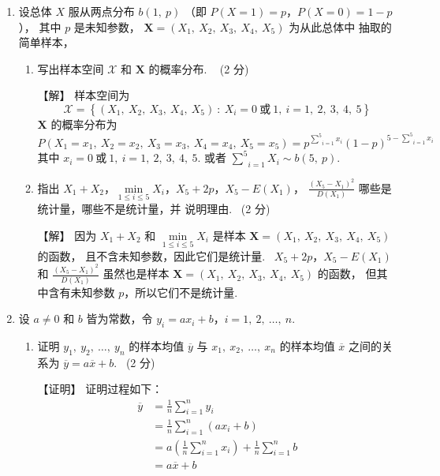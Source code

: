 \documentclass[openany]{book}
\begin{document}
\begin{enumerate}
  \item 设总体 $X$ 服从两点分布 $b(1,~p)$ （即 $P(X=1)=p$，$P(X=0)=1-p$），
  其中 $p$ 是未知参数，
  $\boldsymbol{X} = \left( X_1,~X_2,~X_3,~X_4,~X_5 \right)$ 为从此总体中
  抽取的简单样本，
  \begin{enumerate}
    \item 写出样本空间 $\mathscr{X}$ 和 $\boldsymbol{X}$ 的概率分布.
    ~{\color{cyan} (2 分)}

    {\color{red} \heiti 【解】} {\color{teal} \kaishu
      样本空间为
      $$ \mathscr{X} = \left\{ \left( X_1,~ X_2,~ X_3,~ X_4,~
      X_5\right) ~:~X_i = 0 ~ \text{或} ~1,~ i=1,~2,~3,~4,~5 \right\}
      $$
      $\boldsymbol{X}$ 的概率分布为
      $$ P \left( X_1=x_1,~X_2=x_2,~X_3=x_3,~X_4=x_4,~X_5=x_5 \right)
      = p^{\underset{i=1}{\overset{5}{\sum}} x_i}
      \left( 1 - p \right)^{5 - \underset{i=1}{\overset{5}{\sum}}
        x_i} $$
      其中 $x_i = 0 ~ \text{或} ~1,~ i=1,~2,~3,~4,~5 $. 或者
      $\underset{i=1}{\overset{5}{\sum}} X_i \sim b \left( 5,~ p
      \right)$.
    }

    \item 指出 $X_1+X_2$，$\underset{1\leq i \leq 5}{\min}
    X_i$，$X_5+2p$，$X_5-E\left(X_1\right)$，
    $\displaystyle{\frac{\left(
        X_5-X_1\right)^2}{D\left(X_1\right)}}$ 哪些是统计量，哪些不是统计量，并
    说明理由.~{\color{cyan} (2 分)}

    {\color{red} \heiti 【解】} {\color{teal} \kaishu
      因为 $X_1+X_2$ 和 $\underset{1\leq i \leq 5}{\min} X_i$ 是样本
      $\boldsymbol{X} = \left( X_1,~X_2,~X_3,~X_4,~X_5 \right)$
      的函数，
      且不含未知参数，因此它们是统计量.~
      $X_5+2p$，$X_5-E\left(X_1\right)$ 和 $\displaystyle{\frac{\left(
          X_5-X_1\right)^2}{D\left(X_1\right)}}$  虽然也是样本
      $\boldsymbol{X} = \left( X_1,~X_2,~X_3,~X_4,~X_5 \right)$
      的函数，
      但其中含有未知参数 $p$，所以它们不是统计量.
    }
  \end{enumerate}

  \item 设 $a\not= 0$ 和 $b$ 皆为常数，令
  $y_i=ax_i+b$，$i=1,~2,~\ldots,~n$.
  \begin{enumerate}
    \item 证明 $y_1,~y_2,~\ldots,~y_n$ 的样本均值 $\overline{y}$ 与
    $x_1,~x_2,~\ldots,~x_n$  的样本均值 $\overline{x}$ 之间的关系为
    $\overline{y} = a \overline{x} + b$.~{\color{cyan} (2 分)}

    {\color{red} \heiti 【证明】} {\color{teal} \kaishu
      证明过程如下：
      \begin{align*}
        \overline{y} &= \frac{1}{n} \sum^n_{i=1} y_i  \\
        &= \frac{1}{n} \sum^n_{i=1} \left( a x_i + b \right) \\
        &= a \left( \frac{1}{n} \sum^n_{i=1} x_i \right) +
        \frac{1}{n} \sum^n_{i=1} b \\
        &= a \overline{x} + b
      \end{align*}
    }


\end{enumerate}
\end{enumerate}
\end{document}
